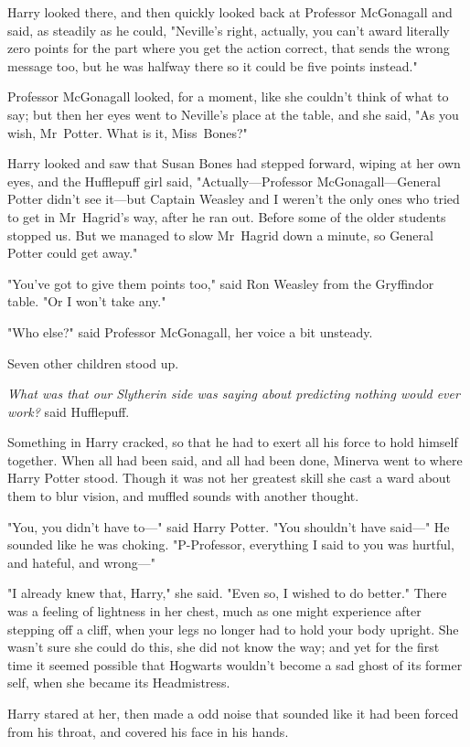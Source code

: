 Harry looked there, and then quickly looked back at Professor McGonagall and
said, as steadily as he could, "Neville's right, actually, you can't award
literally zero points for the part where you get the action correct, that sends
the wrong message too, but he was halfway there so it could be five points
instead."

Professor McGonagall looked, for a moment, like she couldn't think of what to
say; but then her eyes went to Neville's place at the table, and she said, "As
you wish, Mr~Potter. What is it, Miss~Bones?"

Harry looked and saw that Susan Bones had stepped forward, wiping at her own
eyes, and the Hufflepuff girl said, "Actually---Professor McGonagall---General
Potter didn't see it---but Captain Weasley and I weren't the only ones who
tried to get in Mr~Hagrid's way, after he ran out. Before some of the older
students stopped us. But we managed to slow Mr~Hagrid down a minute, so
General Potter could get away."

"You've got to give them points too," said Ron Weasley from the Gryffindor
table. "Or I won't take any."

"Who else?" said Professor McGonagall, her voice a bit unsteady.

Seven other children stood up.

\emph{What was that our Slytherin side was saying about predicting nothing
would ever work?} said Hufflepuff.

Something in Harry cracked, so that he had to exert all his force to hold
himself together.
\later
When all had been said, and all had been done, Minerva went to where Harry
Potter stood. Though it was not her greatest skill she cast a ward about them
to blur vision, and muffled sounds with another thought.

"You, you didn't have to---" said Harry Potter. "You shouldn't have said---" He
sounded like he was choking. "P-Professor, everything I said to you was
hurtful, and hateful, and wrong---"

"I already knew that, Harry," she said. "Even so, I wished to do better." There
was a feeling of lightness in her chest, much as one might experience after
stepping off a cliff, when your legs no longer had to hold your body upright.
She wasn't sure she could do this, she did not know the way; and yet for the
first time it seemed possible that Hogwarts wouldn't become a sad ghost of its
former self, when she became its Headmistress.

Harry stared at her, then made a odd noise that sounded like it had been forced
from his throat, and covered his face in his hands.

